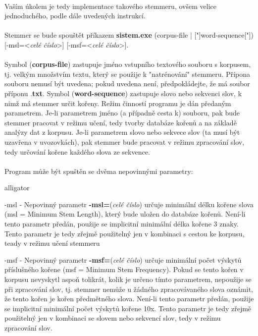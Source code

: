 ﻿\documentclass[12pt, a4paper]{article}
\begin{document}
\paragraph{}
Vaším úkolem je tedy implementace takového stemmeru, ovšem velice jednoduchého, podle dále uvedených instrukcí. 

\paragraph{}
Stemmer se bude spouštět příkazem \textbf{sistem.exe} (corpus-file | ["]word-sequence["]) [-msl=<\textit{celé číslo}>] [-msf=<\textit{celé číslo}>].

\paragraph{}
Symbol (\textbf{corpus-file}) zastupuje jméno vstupního textového souboru s korpusem, tj. velkým množstvím textu, který se použije k "natrénování" stemmeru. Přípona souboru nemusí být uvedena; pokud uvedena není, předpokládejte, že má soubor příponu .\textbf{txt}. Symbol (\textbf{word-sequence}) zastupuje slovo nebo sekvenci slov, k nimž má stemmer určit kořeny. Režim činností programu je dán předaným parametrem. Je-li parametrem jméno (a případně cesta k) souboru, pak bude stemmer pracovat v režimu učení, tedy tvorby databáze kořenů a na základě analýzy dat z korpusu. Je-li parametrem slovo nebo sekvece slov (ta musí být uzavřena v uvozovkách), pak stemmer bude pracovat v režimu zpracování slov, tedy určování kořene každého slova ze sekvence.

\paragraph{}
Program může být spuštěn se dvěma nepovinnými parametry:

\begin{labeling}{alligator}
\item [-msl] - Nepovinný parametr \textbf{-msl=}(\textit{celé číslo}) určuje minimální délku kořene slova (msl = Minimum Stem Length), který bude uložen do databáze kořenů. Není-li tento parametr předán, použije se implicitní minimální délka kořene 3 znaky. Tento parametr je tedy zřejmě použitelný jen v kombinaci s cestou ke korpusu, teady v režimu učení stemmeru
\item [-msf] - Nepovinný parametr \textbf{-msf=}(\textit{celé číslo}) určuje minimální počet výskytů příslušného kořene (msf = Minimum Stem Frequency). Pokud se tento kořen v korpusu nevyskytl aspoň tolikrát, kolik je určeno tímto parametrem, nepoužije se při zpracování slov, tj. stemmer nemůže u žádného zpracovávaného slova oznámit, že tento kořen je kořen předmětného slova. Není-li tento parametr předán, použije se implicitní minimální počet výskytů kořene 10x. Tento parametr je tedy zřejmě použitelný jen v kombinaci se slovem nebo sekvencí slov, tedy v režimu zpracování slov.
\end{labeling}
\end{document}
